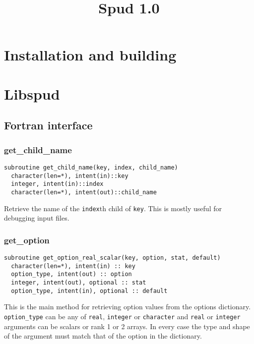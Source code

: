 \documentclass[a4paper, 11pt]{book}
\title{Spud 1.0}
\begin{document}
\maketitle

\tableofcontents
\chapter{Installation and building}

\chapter{Libspud}

\section{Fortran interface}
\lstset{language=Fortran}

\subsection{get\_child\_name}

\begin{lstlisting}
subroutine get_child_name(key, index, child_name)    
  character(len=*), intent(in)::key 
  integer, intent(in)::index
  character(len=*), intent(out)::child_name
\end{lstlisting}

Retrieve the name of the \lstinline+index+th child of \lstinline+key+. This
is mostly useful for debugging input files.

\subsection{get\_option}

\begin{lstlisting}[emph=option_type,emphstyle=\textit]
subroutine get_option_real_scalar(key, option, stat, default)
  character(len=*), intent(in) :: key
  option_type, intent(out) :: option
  integer, intent(out), optional :: stat
  option_type, intent(in), optional :: default
\end{lstlisting}

This is the main method for retrieving option values from the options
dictionary. \lstinline[emph=option_type,emphstyle=\textit]+option_type+ can
be any of \lstinline+real+, \lstinline+integer+ or
\lstinline+character+ and \lstinline+real+ or \lstinline+integer+ arguments can be
scalars or rank 1 or 2 arrays. In every case the type and shape of the
argument must match that of the option in the dictionary.
\end{document}
